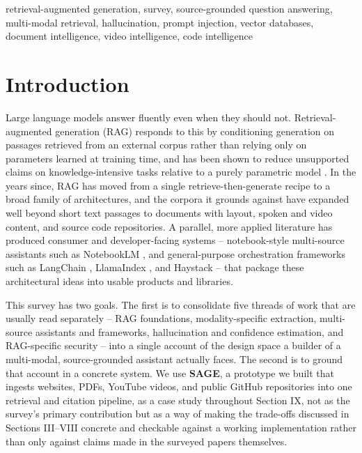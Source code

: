 \documentclass[conference]{IEEEtran}
\begin{document}
\begin{IEEEkeywords}
retrieval-augmented generation, survey, source-grounded question
answering, multi-modal retrieval, hallucination, prompt injection,
vector databases, document intelligence, video intelligence, code
intelligence
\end{IEEEkeywords}

\section{Introduction}

Large language models answer fluently even when they should not.
Retrieval-augmented generation (RAG) responds to this by conditioning
generation on passages retrieved from an external corpus rather than
relying only on parameters learned at training time, and has been shown
to reduce unsupported claims on knowledge-intensive tasks relative to a
purely parametric model \cite{lewis2020rag}. In the years since, RAG has
moved from a single retrieve-then-generate recipe to a broad family of
architectures, and the corpora it grounds against have expanded well
beyond short text passages to documents with layout, spoken and video
content, and source code repositories. A parallel, more applied
literature has produced consumer and developer-facing systems --
notebook-style multi-source assistants such as NotebookLM
\cite{notebooklm2026}, and general-purpose orchestration frameworks such
as LangChain \cite{langchain2026}, LlamaIndex \cite{llamaindex2026}, and
Haystack \cite{haystack2026} -- that package these architectural ideas
into usable products and libraries.

This survey has two goals. The first is to consolidate five threads of
work that are usually read separately -- RAG foundations, modality-specific
extraction, multi-source assistants and frameworks, hallucination and
confidence estimation, and RAG-specific security -- into a single
account of the design space a builder of a multi-modal, source-grounded
assistant actually faces. The second is to ground that account in a
concrete system. We use \textbf{SAGE}, a prototype we built that ingests
websites, PDFs, YouTube videos, and public GitHub repositories into one
retrieval and citation pipeline, as a case study throughout Section IX,
not as the survey's primary contribution but as a way of making the
trade-offs discussed in Sections III--VIII concrete and checkable
against a working implementation rather than only against claims made
in the surveyed papers themselves.
\end{document}
